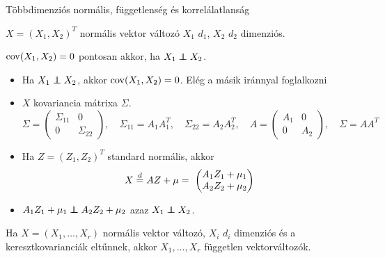 \documentclass[aspectratio=169,notheorems,9pt,\option]{beamer}
\begin{document}
\begin{frame}{Többdimenziós normális, függetlenség és korrelálatlanság}
  \begin{proposition}
    $X=(X_1,X_2)^T$ normális vektor változó $X_1$ $d_1$, $X_2$ $d_2$
    dimenziós.

    $\operatorname{cov} (X_1,X_2)=0$ pontosan akkor, ha $X_1\independent X_2$.
  \end{proposition}
  \begin{itemize}
  \item Ha $X_1\independent X_2$, akkor $\operatorname{cov} (X_1,X_2)=0$. Elég a
    másik iránnyal foglalkozni
  \item $X$ kovariancia mátrixa $\Sigma$.
    \begin{displaymath}
      \Sigma=
      \begin{pmatrix}
        \Sigma_{11}&0\\0&\Sigma_{22}
      \end{pmatrix},
      \quad \Sigma_{11}=A_1A_1^T,\quad \Sigma_{22}=A_2A_2^T,\quad
      A=
      \begin{pmatrix}
        A_{1}&0\\0&A_{2}
      \end{pmatrix},
      \quad
      \Sigma=AA^T
    \end{displaymath}
   
  \item Ha $Z=(Z_1,Z_2)^T$ standard normális, akkor
    \begin{displaymath}
      X\stackrel{d}{=} AZ+\mu=\
      \begin{pmatrix}
        A_1Z_1+\mu_1\\
        A_2Z_2+\mu_2
      \end{pmatrix}
    \end{displaymath}
  \item $A_1Z_1+\mu_1\independent A_2Z_2+\mu_2$ azaz $X_1\independent X_2$.
  \end{itemize}
  \continue
  Ha $X=(X_1,\dots,X_r)$ normális vektor változó, $X_i$ 
  $d_i$ dimenziós és a keresztkovarianciák eltűnnek, akkor 
  $X_1,\dots,X_r$ független vektorváltozók.
\end{frame}

\end{document}
